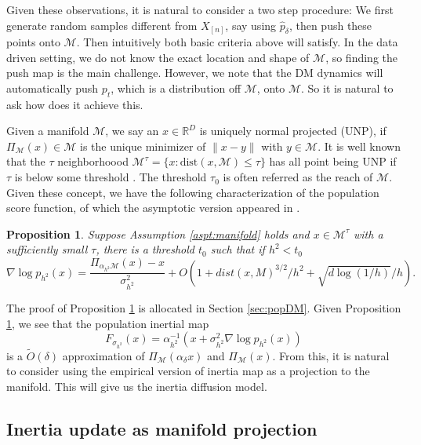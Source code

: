 \documentclass{article}
\newtheorem{pro}[theorem]{Proposition}
\def\phat{\hat{p}}
\def\Otilde{\widetilde{O}}
\def\calM{\mathcal{M}}
\begin{document}
Given these observations, it is natural to consider a two step procedure: We first generate random samples different from $X_{[n]}$, say using $\phat_{\delta}$, then push these points onto $\calM$. Then intuitively both basic criteria above will satisfy. In the data driven setting, we do not know the exact location and shape of $\calM$,  so finding the push map is the main challenge. However, we note that the DM dynamics will automatically push $p_t$, which is a distribution off $\calM$, onto $\calM$. So it is natural to ask how does it achieve this.   


Given a manifold $\calM$, we say an  $x\in \mathbb{R}^D$ is uniquely normal projected (UNP), if $\Pi_{\calM}(x)\in \calM$ is the unique minimizer of $\|x-y\|$ with $y\in \calM$.
It is well known that the $\tau$ neighborhoood $\calM^\tau=\{x:\text{dist}(x,\calM)\leq \tau \}$  has all point being UNP if $\tau$ is below some threshold \cite{leobacher2021existence}. The  threshold $\tau_0$ is often referred as the reach of $\calM$. 
Given these concept, we have the following characterization of the population score function, of which the asymptotic version appeared in \cite{lu2023mathematical}.   
\begin{pro}
\label{pro:popDM}
Suppose Assumption \ref{aspt:manifold}  holds and $x\in \calM^{\tau}$ with a sufficiently small $\tau$, there is a threshold $t_0$ such that if $h^2<t_0$
\[
\nabla \log p_{h^2}(x) =
\frac{\Pi_{\alpha_{h^2}\calM}(x)-x}{\sigma_{h^2}^2}+
O(1+dist(x,M)^{3/2}/h^2+\sqrt{d\log (1/h)}/h). 
\]
\end{pro}
The proof of Proposition \ref{pro:popDM} is allocated in Section \ref{sec:popDM}. Given Proposition \ref{pro:popDM}, we see that the population inertial map 
\begin{equation}
F_{\sigma_{h^2}}(x)=\alpha_{h^2}^{-1}(x+\sigma^2_{h^2} \nabla \log p_{h^2}(x))
\end{equation}
is a $\Otilde(\delta)$ approximation of $\Pi_\calM(\alpha_\delta x)$ and $\Pi_\calM(x)$. From this, it is natural to consider using the empirical version of inertia map as a projection to the manifold. This will give us the inertia diffusion model. 






\subsection{Inertia update as manifold projection}
\end{document}

